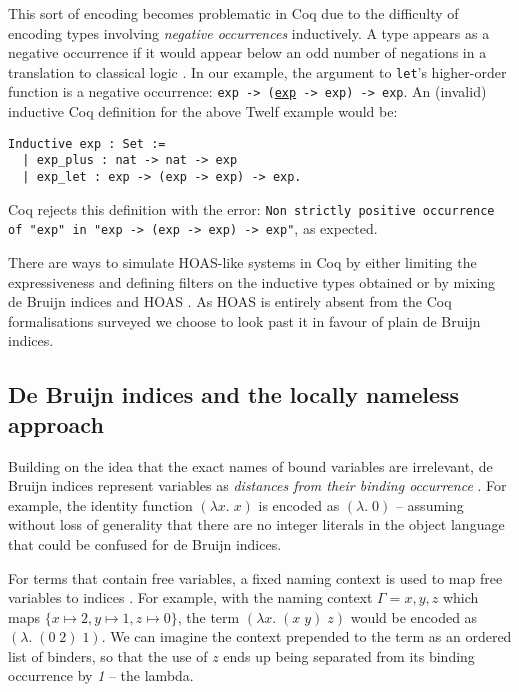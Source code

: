 \documentclass[]{unswthesis}
\let\c\texttt
\let\i\textit
\begin{document}
This sort of encoding becomes problematic in Coq due to the difficulty of encoding types involving \i{negative occurrences} inductively. A type appears as a negative occurrence if it would appear below an odd number of negations in a translation to classical logic \cite{tapl}. In our example, the argument to \c{let}'s higher-order function is a negative occurrence: \c{exp -> (\underline{exp} -> exp) -> exp}. An (invalid) inductive Coq definition for the above Twelf example would be:

\begin{verbatim}
Inductive exp : Set :=
  | exp_plus : nat -> nat -> exp
  | exp_let : exp -> (exp -> exp) -> exp.
\end{verbatim}

Coq rejects this definition with the error: \c{Non strictly positive occurrence of "exp" in
 "exp -> (exp -> exp) -> exp"}, as expected.

There are ways to simulate HOAS-like systems in Coq by either limiting the expressiveness and defining filters on the inductive types obtained \cite{despeyroux95} or by mixing de Bruijn indices and HOAS \cite{capretta07}. As HOAS is entirely absent from the Coq formalisations surveyed we choose to look past it in favour of plain de Bruijn indices.

\subsection{De Bruijn indices and the locally nameless approach}
\label{sec:de_bruijn}

Building on the idea that the exact names of bound variables are irrelevant, de Bruijn indices represent variables as \i{distances from their binding occurrence} \cite{deBruijn72}. For example, the identity function $(\lambda x. \; x)$ is encoded as $(\lambda . \; 0)$ -- assuming without loss of generality that there are no integer literals in the object language that could be confused for de Bruijn indices.

For terms that contain free variables, a fixed naming context is used to map free variables to indices \cite{tapl}. For example, with the naming context $\Gamma = x, y, z$ which maps $\{x \mapsto 2, y \mapsto 1, z \mapsto 0\}$, the term $(\lambda x. \; (x \; y) \; z)$ would be encoded as $(\lambda. \; (0 \; 2) \; 1)$. We can imagine the context prepended to the term as an ordered list of binders, so that the use of $z$ ends up being separated from its binding occurrence by \i{1} -- the lambda.
\end{document}
